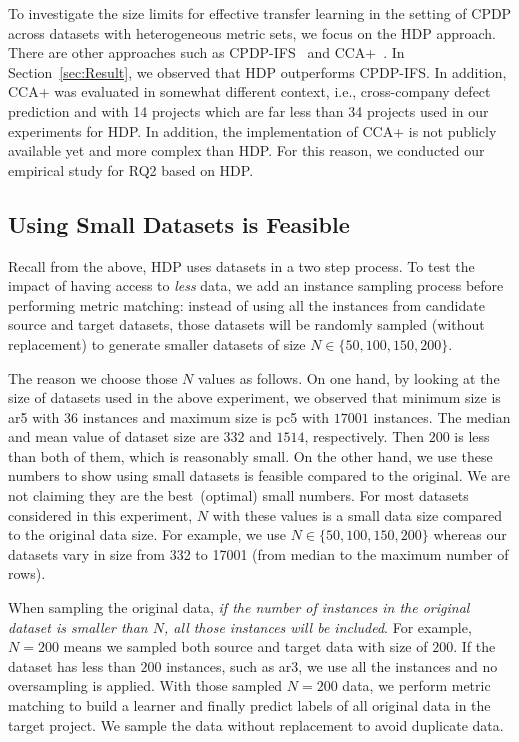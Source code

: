 To investigate the size limits for effective transfer learning in the setting of CPDP across datasets with heterogeneous metric sets, we focus on the HDP approach. There are other approaches such as CPDP-IFS~\cite{He14} and CCA+~\cite{Jing15}. In Section~\ref{sec:Result}, we observed that HDP outperforms CPDP-IFS. In addition, CCA+ was evaluated in somewhat different context, i.e., cross-company defect prediction and with 14 projects which are far less than 34 projects used in our experiments for HDP. In addition, the implementation of CCA+ is not publicly available yet and more complex than HDP. For this reason, we conducted our empirical study for RQ2 based on HDP.




\subsection{Using Small Datasets is Feasible}

Recall from the above,
HDP uses  datasets  in a two step process.
To test the impact of having access to {\em less} data,
we  add an instance sampling process before performing metric matching:
instead of using all the instances from
candidate source and target datasets, those datasets will
be randomly sampled (without replacement) to generate smaller datasets of
size $N \in \{50, 100, 150, 200\}$.

The reason we choose those $N$ values as follows. On one hand, by looking at the size of datasets used in the
above experiment, we observed that minimum size is ar5 with $36$ instances and maximum size is pc5 with $17001$ instances.
The median and mean value of dataset size are $332$ and $1514$, respectively. Then $200$ is less than both of
them, which is reasonably small.
On the other hand, we use these numbers to show using small datasets is feasible compared to
the original. We are not claiming they are the best~(optimal) small numbers. For most datasets considered in this experiment, $N$ with these values is a
small data size compared to the original data size. For example, we use $N \in \{50, 100, 150, 200\}$ whereas our datasets vary in size from 332 to 17001 (from median
to the maximum number of rows).

When sampling the original data, {\it if
the number of instances in the original dataset is
smaller than $N$, all those instances will be
included}. For example, $N=200$ means we sampled both source and target data with size of $200$. If the dataset has less than $200$ instances, such as ar3, we use all
the instances and no oversampling is applied. With those sampled $N=200$ data, we perform metric matching to build a learner
and finally predict labels of all original data in the target project. We sample the data without replacement
to avoid duplicate data.

